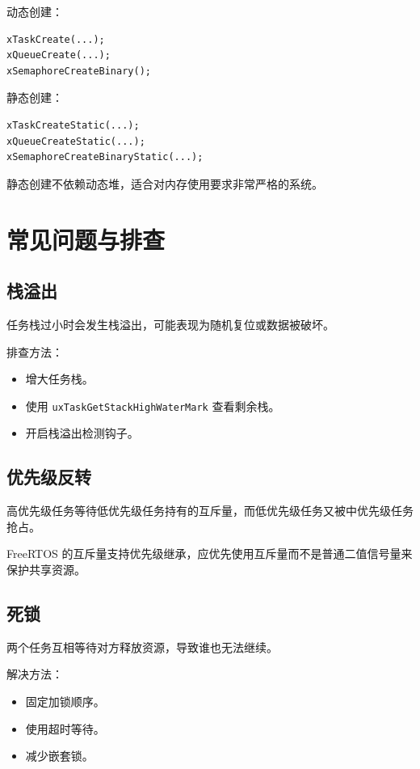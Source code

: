 \documentclass[12pt,a4paper]{ctexart}
\begin{document}
动态创建：

\begin{lstlisting}
xTaskCreate(...);
xQueueCreate(...);
xSemaphoreCreateBinary();
\end{lstlisting}

静态创建：

\begin{lstlisting}
xTaskCreateStatic(...);
xQueueCreateStatic(...);
xSemaphoreCreateBinaryStatic(...);
\end{lstlisting}

静态创建不依赖动态堆，适合对内存使用要求非常严格的系统。

\section{常见问题与排查}

\subsection{栈溢出}

任务栈过小时会发生栈溢出，可能表现为随机复位或数据被破坏。

排查方法：

\begin{itemize}
    \item 增大任务栈。
    \item 使用 \texttt{uxTaskGetStackHighWaterMark} 查看剩余栈。
    \item 开启栈溢出检测钩子。
\end{itemize}

\subsection{优先级反转}

高优先级任务等待低优先级任务持有的互斥量，而低优先级任务又被中优先级任务抢占。

FreeRTOS 的互斥量支持优先级继承，应优先使用互斥量而不是普通二值信号量来保护共享资源。

\subsection{死锁}

两个任务互相等待对方释放资源，导致谁也无法继续。

解决方法：

\begin{itemize}
    \item 固定加锁顺序。
    \item 使用超时等待。
    \item 减少嵌套锁。
\end{itemize}
\end{document}
